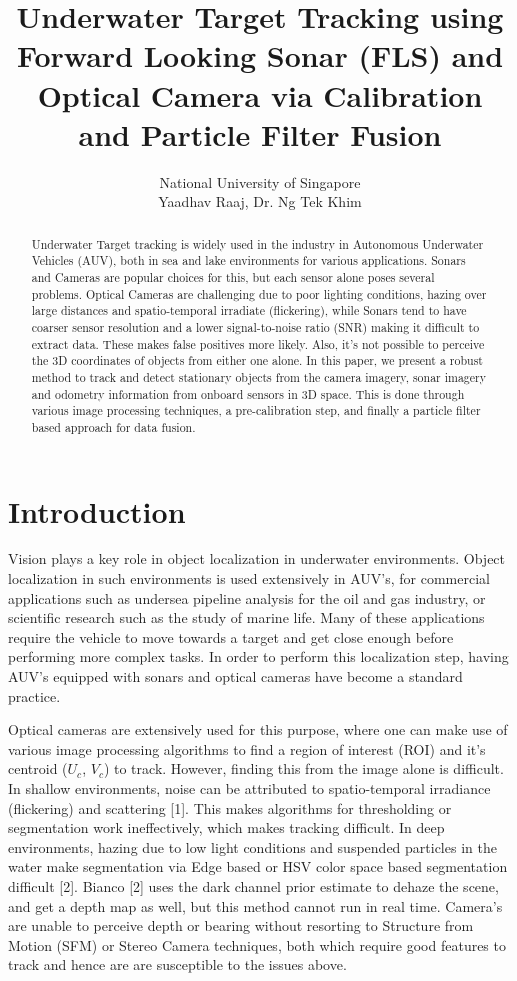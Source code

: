 \documentclass[a4paper]{IEEEtran}
\title{
Underwater Target Tracking using Forward Looking Sonar (FLS) and Optical Camera via Calibration and Particle Filter Fusion
}
\author{
National University of Singapore \\
Yaadhav Raaj, Dr. Ng Tek Khim
}
\newcommand{\UCamera}{$\si{\textit{U}_{c}}$\xspace}
\newcommand{\VCamera}{$\si{\textit{V}_{c}}$\xspace}
\begin{document}
\maketitle

\small

\begin{abstract}
Underwater Target tracking is widely used in the industry in Autonomous Underwater Vehicles (AUV), both in sea and lake environments for various applications. Sonars and Cameras are popular choices for this, but each sensor alone poses several problems. Optical Cameras are challenging due to poor lighting conditions, hazing over large distances and spatio-temporal irradiate (flickering), while Sonars tend to have coarser sensor resolution and a lower signal-to-noise ratio (SNR) making it difficult to extract data. These makes false positives more likely. Also, it's not possible to perceive the 3D coordinates of objects from either one alone. In this paper, we present a robust method to track and detect stationary objects from the camera imagery, sonar imagery and odometry information from onboard sensors in 3D space. This is done through various image processing techniques, a pre-calibration step, and finally a particle filter based approach for data fusion.
\end{abstract}

\section{Introduction}
Vision plays a key role in object localization in underwater environments. Object localization in such environments is used extensively in AUV's, for commercial applications such as undersea pipeline analysis for the oil and gas industry, or scientific research such as the study of marine life. Many of these applications require the vehicle to move towards a target and get close enough before performing more complex tasks. In order to perform this localization step, having AUV's equipped with sonars and optical cameras have become a standard practice. 

Optical cameras are extensively used for this purpose, where one can make use of various image processing algorithms to find a region of interest (ROI) and it's centroid (\UCamera, \VCamera) to track. However, finding this from the image alone is difficult. In shallow environments, noise can be attributed to spatio-temporal irradiance (flickering) and scattering [1]. This makes algorithms for thresholding or segmentation work ineffectively, which makes tracking difficult. In deep environments, hazing due to low light conditions and suspended particles in the water make segmentation via Edge based or HSV color space based segmentation difficult [2]. Bianco [2] uses the dark channel prior estimate to dehaze the scene, and get a depth map as well, but this method cannot run in real time. Camera's are unable to perceive depth or bearing without resorting to Structure from Motion (SFM) or Stereo Camera techniques, both which require good features to track and hence are are susceptible to the issues above.
\end{document}

